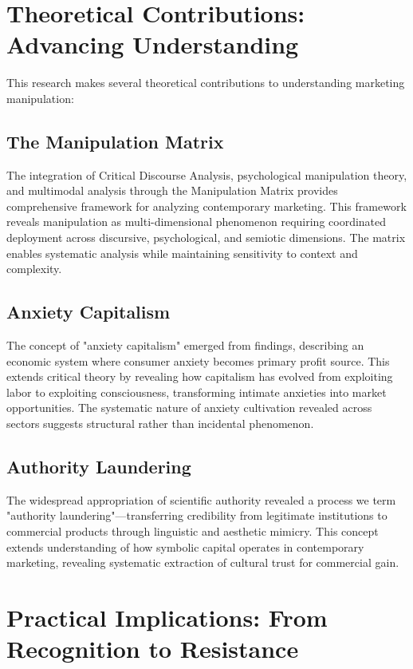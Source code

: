 \section{Theoretical Contributions: Advancing Understanding}
\label{sec:theoretical_contributions}

This research makes several theoretical contributions to understanding marketing manipulation:

\subsection{The Manipulation Matrix}

The integration of Critical Discourse Analysis, psychological manipulation theory, and multimodal analysis through the Manipulation Matrix provides comprehensive framework for analyzing contemporary marketing. This framework reveals manipulation as multi-dimensional phenomenon requiring coordinated deployment across discursive, psychological, and semiotic dimensions. The matrix enables systematic analysis while maintaining sensitivity to context and complexity.

\subsection{Anxiety Capitalism}

The concept of "anxiety capitalism" emerged from findings, describing an economic system where consumer anxiety becomes primary profit source. This extends critical theory by revealing how capitalism has evolved from exploiting labor to exploiting consciousness, transforming intimate anxieties into market opportunities. The systematic nature of anxiety cultivation revealed across sectors suggests structural rather than incidental phenomenon.

\subsection{Authority Laundering}

The widespread appropriation of scientific authority revealed a process we term "authority laundering"—transferring credibility from legitimate institutions to commercial products through linguistic and aesthetic mimicry. This concept extends understanding of how symbolic capital operates in contemporary marketing, revealing systematic extraction of cultural trust for commercial gain.

\section{Practical Implications: From Recognition to Resistance}
\label{sec:practical_implications}

